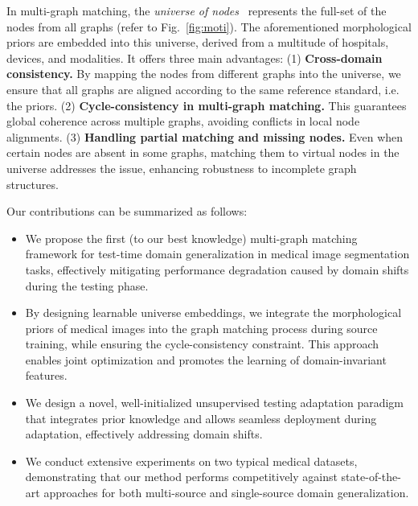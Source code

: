 In multi-graph matching, the \textit{universe of nodes}~\cite{pachauri2013solving,tron2017fast} represents the full-set of the nodes from all graphs (refer to Fig.~\ref{fig:moti}). The aforementioned morphological priors are embedded into this universe, derived from a multitude of hospitals, devices, and modalities. It offers three main advantages: (1) \textbf{Cross-domain consistency.} By mapping the nodes from different graphs into the universe, we ensure that all graphs are aligned according to the same reference standard, i.e. the priors. (2) \textbf{Cycle-consistency in multi-graph matching.} This guarantees global coherence across multiple graphs, avoiding conflicts in local node alignments. (3) \textbf{Handling partial matching and missing nodes.} Even when certain nodes are absent in some graphs, matching them to virtual nodes in the universe addresses the issue, enhancing robustness to incomplete graph structures. 

Our contributions can be summarized as follows:

\begin{itemize}
\item We propose the first (to our best knowledge) multi-graph matching framework for test-time domain generalization in medical image segmentation tasks, effectively mitigating performance degradation caused by domain shifts during the testing phase.

\item  By designing learnable universe embeddings, we integrate the morphological priors of medical images into the graph matching process during source training, while ensuring the cycle-consistency constraint. This approach enables joint optimization and promotes the learning of domain-invariant features.

\item We design a novel, well-initialized unsupervised testing adaptation paradigm that integrates prior knowledge and allows seamless deployment during adaptation, effectively addressing domain shifts. 

\item  We conduct extensive experiments on two typical medical datasets, demonstrating that our method performs competitively against state-of-the-art approaches for both multi-source and single-source domain generalization.

\end{itemize}
